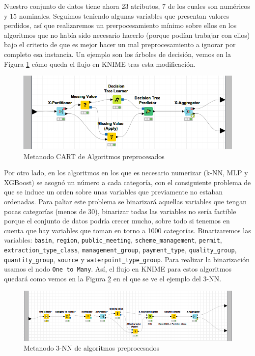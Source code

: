 \documentclass[a4paper, 20pt]{article}
\begin{document}
Nuestro conjunto de datos tiene ahora 23 atributos, 7 de los cuales son numéricos y 15 nominales. Seguimos teniendo algunas variables que presentan valores perdidos, así que realizaremos un prerpocesamiento mínimo sobre ellos en los algoritmos que no había sido necesario hacerlo (porque podían trabajar con ellos) bajo el criterio de que es mejor hacer un mal preprocesamiento a ignorar por completo esa instancia. Un ejemplo son los árboles de decisión, vemos en la Figura \ref{fig:CART} cómo queda el flujo en KNIME tras esta modificación.

\begin{figure}[H]
    \centering
    \includegraphics[width=1\textwidth]{CART}
    \caption{Metanodo CART de Algoritmos preprocesados}
    \label{fig:CART}
\end{figure}

Por otro lado, en los algoritmos en los que es necesario numerizar (k-NN, MLP y XGBoost) se asognó un número a cada categoría, con el consiguiente problema de que se induce un orden sobre unas variables que previamente no estaban ordenadas. Para paliar este problema se binarizará aquellas variables que tengan pocas categorías (menos de 30), binarizar todas las variables no sería factible porque el conjunto de datos podría crecer mucho, sobre todo si tenemos en cuenta que hay variables que toman en torno a 1000 categorías. Binarizaremos las variables: \texttt{basin}, \texttt{region}, \texttt{public\_meeting}, \texttt{scheme\_management}, \texttt{permit}, \texttt{extraction\_type\_class}, \texttt{management\_group}, \texttt{payment\_type}, \texttt{quality\_group}, \texttt{quantity\_group}, \texttt{source} y \texttt{waterpoint\_type\_group}. Para realizar la binarización usamos el nodo \texttt{One to Many}. Así, el flujo en KNIME para estos algoritmos quedará como vemos en la Figura \ref{fig:knnotm} en el que se ve el ejemplo del 3-NN.

\begin{figure}[H]
    \centering
    \includegraphics[width=1\textwidth]{knnotm}
    \caption{Metanodo 3-NN de algoritmos preprocesados}
    \label{fig:knnotm}
\end{figure}
\end{document}
